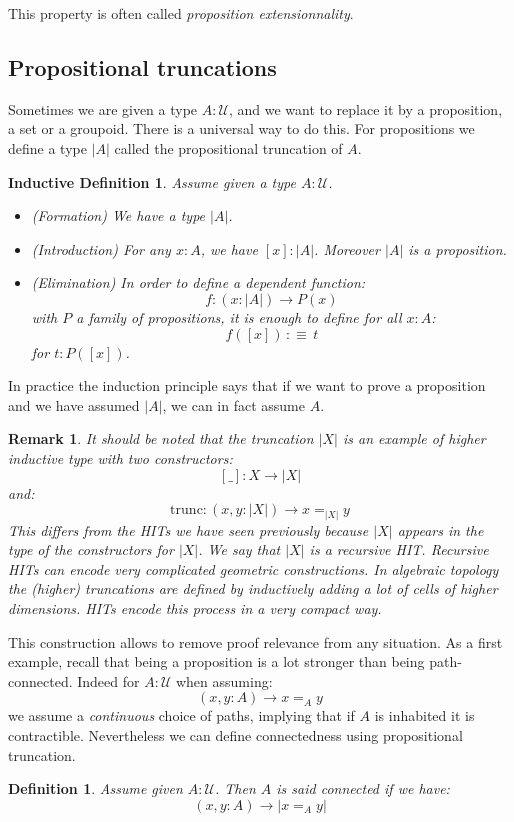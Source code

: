 \documentclass{article}
\newcommand{\sse}[1]{\medbreak \subsection{#1}}
\newcommand{\U}{{\mathcal U}}
\renewcommand{\r}{\rightarrow}
\newtheorem{definition}{Definition}
\newtheorem{remark}{Remark}
\newtheorem{ind_def}{Inductive Definition}
\begin{document}
This property is often called \emph{proposition extensionnality}.


\sse{Propositional truncations}

Sometimes we are given a type $A:\U$, and we want to replace it by a proposition, a set or a groupoid. There is a universal way to do this. For propositions we define a type $|A|$ called the propositional truncation of $A$.

\begin{ind_def}
Assume given a type $A:\U$.
\begin{itemize}
\item (Formation) We have a type $|A|$.
\item (Introduction) For any $x:A$, we have $[x]:|A|$. Moreover $|A|$ is a proposition.
\item (Elimination) In order to define a dependent function: 
\[f:(x:|A|) \r P(x)\]
with $P$ a family of propositions, it is enough to define for all $x:A$:
\[f([x])\, :\equiv \, t\]
for $t:P([x])$.
\end{itemize}
\end{ind_def}

In practice the induction principle says that if we want to prove a proposition and we have assumed $|A|$, we can in fact assume $A$. 

\begin{remark}
It should be noted that the truncation $|X|$ is an example of higher inductive type with two constructors:
\[[\_] : X\r |X|\]
and: 
\[\mathrm{trunc}: (x,y:|X|) \r x=_{|X|} y\]
This differs from the HITs we have seen previously because $|X|$ appears in the type of the constructors for $|X|$. We say that $|X|$ is a recursive HIT. Recursive HITs can encode very complicated geometric constructions. In algebraic topology the (higher) truncations are defined by inductively adding a lot of cells of higher dimensions. HITs encode this process in a very compact way.
\end{remark} 


This construction allows to remove proof relevance from any situation. As a first example, recall that being a proposition is a lot stronger than being path-connected. Indeed for $A:\U$ when assuming:
\[(x,y:A)\r x=_Ay\]
we assume a \emph{continuous} choice of paths, implying that if $A$ is inhabited it is contractible. Nevertheless we can define connectedness using propositional truncation.

\begin{definition}
Assume given $A:\U$. Then $A$ is said connected if we have:
\[(x,y:A)\r |x=_Ay|\]
\end{definition}
\end{document}

